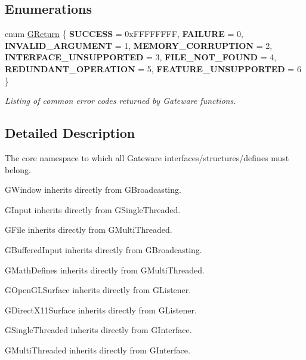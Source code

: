 \subsection*{Enumerations}
\begin{DoxyCompactItemize}
\item 
\mbox{\label{namespaceGW_a67a839e3df7ea8a5c5686613a7a3de21}} 
enum \hyperlink{namespaceGW_a67a839e3df7ea8a5c5686613a7a3de21}{G\+Return} \{ \newline
{\bfseries S\+U\+C\+C\+E\+SS} = 0x\+F\+F\+F\+F\+F\+F\+FF, 
{\bfseries F\+A\+I\+L\+U\+RE} = 0, 
{\bfseries I\+N\+V\+A\+L\+I\+D\+\_\+\+A\+R\+G\+U\+M\+E\+NT} = 1, 
{\bfseries M\+E\+M\+O\+R\+Y\+\_\+\+C\+O\+R\+R\+U\+P\+T\+I\+ON} = 2, 
\newline
{\bfseries I\+N\+T\+E\+R\+F\+A\+C\+E\+\_\+\+U\+N\+S\+U\+P\+P\+O\+R\+T\+ED} = 3, 
{\bfseries F\+I\+L\+E\+\_\+\+N\+O\+T\+\_\+\+F\+O\+U\+ND} = 4, 
{\bfseries R\+E\+D\+U\+N\+D\+A\+N\+T\+\_\+\+O\+P\+E\+R\+A\+T\+I\+ON} = 5, 
{\bfseries F\+E\+A\+T\+U\+R\+E\+\_\+\+U\+N\+S\+U\+P\+P\+O\+R\+T\+ED} = 6
 \}\begin{DoxyCompactList}\small\item\em Listing of common error codes returned by Gateware functions. \end{DoxyCompactList}
\end{DoxyCompactItemize}


\subsection{Detailed Description}
The core namespace to which all Gateware interfaces/structures/defines must belong. 

G\+Window inherits directly from G\+Broadcasting.

G\+Input inherits directly from G\+Single\+Threaded.

G\+File inherits directly from G\+Multi\+Threaded.

G\+Buffered\+Input inherits directly from G\+Broadcasting.

G\+Math\+Defines inherits directly from G\+Multi\+Threaded.

G\+Open\+G\+L\+Surface inherits directly from G\+Listener.

G\+Direct\+X11\+Surface inherits directly from G\+Listener.

G\+Single\+Threaded inherits directly from G\+Interface.

G\+Multi\+Threaded inherits directly from G\+Interface.

